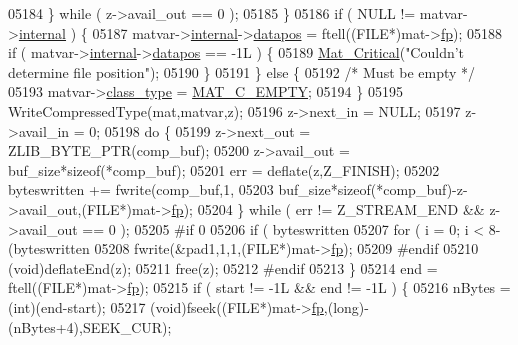 \begin{DoxyCode}
{{{{{{{{{{{{{{{{{{{{{{{{{{{{{{{05184             \} \textcolor{keywordflow}{while} ( z->avail\_out == 0 );
05185         \}
05186         \textcolor{keywordflow}{if} ( NULL != matvar->\hyperlink{group___m_a_t_a6e97e3ed9f40c49322c18561c2a94e92}{internal} ) \{
05187             matvar->\hyperlink{group___m_a_t_a6e97e3ed9f40c49322c18561c2a94e92}{internal}->\hyperlink{structmatvar__internal_afd3bfaab126a160bd6855563e1ea0a7e}{datapos} = ftell((FILE*)mat->\hyperlink{struct__mat__t_a85f562e407ca9ad4d2a6e14f839432b7}{fp});
05188             \textcolor{keywordflow}{if} ( matvar->\hyperlink{group___m_a_t_a6e97e3ed9f40c49322c18561c2a94e92}{internal}->\hyperlink{structmatvar__internal_afd3bfaab126a160bd6855563e1ea0a7e}{datapos} == -1L ) \{
05189                 \hyperlink{group__mat__util_gaf51f2bfbb5580f575e4dd79757e2b80c}{Mat\_Critical}(\textcolor{stringliteral}{"Couldn't determine file position"});
05190             \}
05191         \} \textcolor{keywordflow}{else} \{
05192             \textcolor{comment}{/* Must be empty */}
05193             matvar->\hyperlink{group___m_a_t_aff13035bf3265dd7d9425e5d40c839d4}{class\_type} = \hyperlink{group___m_a_t_ggad4d60ae7b709fc81bfd744fb4c857c40a5c76eef0ca0373d25abe49053be6fa9a}{MAT\_C\_EMPTY};
05194         \}
05195         WriteCompressedType(mat,matvar,z);
05196         z->next\_in  = NULL;
05197         z->avail\_in = 0;
05198         \textcolor{keywordflow}{do} \{
05199             z->next\_out  = ZLIB\_BYTE\_PTR(comp\_buf);
05200             z->avail\_out = buf\_size*\textcolor{keyword}{sizeof}(*comp\_buf);
05201             err = deflate(z,Z\_FINISH);
05202             byteswritten += fwrite(comp\_buf,1,
05203                 buf\_size*\textcolor{keyword}{sizeof}(*comp\_buf)-z->avail\_out,(FILE*)mat->\hyperlink{struct__mat__t_a85f562e407ca9ad4d2a6e14f839432b7}{fp});
05204         \} \textcolor{keywordflow}{while} ( err != Z\_STREAM\_END && z->avail\_out == 0 );
05205 \textcolor{preprocessor}{#if 0}
05206         \textcolor{keywordflow}{if} ( byteswritten %
05207             \textcolor{keywordflow}{for} ( i = 0; i < 8-(byteswritten %
05208                 fwrite(&pad1,1,1,(FILE*)mat->\hyperlink{struct__mat__t_a85f562e407ca9ad4d2a6e14f839432b7}{fp});
05209 \textcolor{preprocessor}{#endif}
05210         (void)deflateEnd(z);
05211         free(z);
05212 \textcolor{preprocessor}{#endif}
05213     \}
05214     end = ftell((FILE*)mat->\hyperlink{struct__mat__t_a85f562e407ca9ad4d2a6e14f839432b7}{fp});
05215     \textcolor{keywordflow}{if} ( start != -1L && end != -1L ) \{
05216         nBytes = (int)(end-start);
05217         (void)fseek((FILE*)mat->\hyperlink{struct__mat__t_a85f562e407ca9ad4d2a6e14f839432b7}{fp},(long)-(nBytes+4),SEEK\_CUR);
}}}}}}}}}}}}}}}}}}}}}}}}}}}}}}}
\end{DoxyCode}
